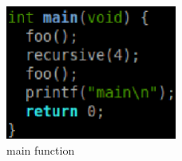 \documentclass[11pt,letterpaper,oneside]{article}
\begin{document}
\begin{figure}
\begin{center}
\includegraphics[width=0.5\textwidth]{fig7.eps}
\caption{main function}
\label{fig:main}
\end{center}
\end{figure}

\end{document}
